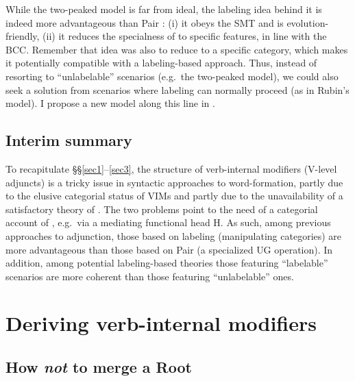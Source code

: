 \documentclass[output=paper]{langsci/langscibook}
\begin{document}
While the two-peaked model is far from ideal, the labeling idea behind it is
indeed more advantageous than Pair :
(i) it obeys the \gls{SMT} and is evolution-friendly,
(ii) it reduces the specialness of  to specific features, in line with the BCC.
Remember that  idea was also to reduce  to a
specific category, which makes it potentially compatible with a labeling-based
approach. Thus, instead of resorting to ``unlabelable'' scenarios (e.g.\ the
two-peaked model), we could also seek a solution from scenarios where labeling
can normally proceed (as in Rubin's model). I propose a new model along this
line in .

\subsection{Interim summary}\label{sec3.3}

To recapitulate §§\ref{sec1}--\ref{sec3}, the structure of verb-internal
modifiers (V-level adjuncts) is a tricky issue in syntactic approaches to
word-formation, partly due to the elusive categorial status of \glspl{VIM} and
partly due to the unavailability of a satisfactory theory of . The
two problems point to the need of a categorial account of , e.g.\ via
a mediating functional head H. As such, among previous approaches to
adjunction, those based on labeling (manipulating categories) are more
advantageous than those based on Pair  (a specialized \gls{UG} operation).
In addition, among potential labeling-based theories those featuring
``labelable'' scenarios are more coherent than those featuring ``unlabelable''
ones.

\section{Deriving verb-internal modifiers}\label{sec4}

\subsection{How \emph{not} to merge a Root}\label{sec4.1}
\end{document}

